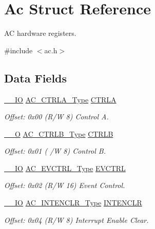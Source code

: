 \hypertarget{struct_ac}{}\section{Ac Struct Reference}
\label{struct_ac}


AC hardware registers.  




{\ttfamily \#include $<$ac.\+h$>$}

\subsection*{Data Fields}
\begin{DoxyCompactItemize}
\item 
\mbox{\hyperlink{core__cm0plus_8h_aec43007d9998a0a0e01faede4133d6be}{\+\_\+\+\_\+\+IO}} \mbox{\hyperlink{union_a_c___c_t_r_l_a___type}{A\+C\+\_\+\+C\+T\+R\+L\+A\+\_\+\+Type}} \mbox{\hyperlink{struct_ac_a3209b7b8f542b802bd759d39be69aed8}{C\+T\+R\+LA}}
\begin{DoxyCompactList}\small\item\em Offset\+: 0x00 (R/W 8) Control A. \end{DoxyCompactList}\item 
\mbox{\hyperlink{core__cm0plus_8h_a7e25d9380f9ef903923964322e71f2f6}{\+\_\+\+\_\+O}} \mbox{\hyperlink{union_a_c___c_t_r_l_b___type}{A\+C\+\_\+\+C\+T\+R\+L\+B\+\_\+\+Type}} \mbox{\hyperlink{struct_ac_a05e0ac5f8548b79a95ad9a3f2bbc5641}{C\+T\+R\+LB}}
\begin{DoxyCompactList}\small\item\em Offset\+: 0x01 ( /W 8) Control B. \end{DoxyCompactList}\item 
\mbox{\hyperlink{core__cm0plus_8h_aec43007d9998a0a0e01faede4133d6be}{\+\_\+\+\_\+\+IO}} \mbox{\hyperlink{union_a_c___e_v_c_t_r_l___type}{A\+C\+\_\+\+E\+V\+C\+T\+R\+L\+\_\+\+Type}} \mbox{\hyperlink{struct_ac_a321f3540f3ac416a80a108404610685d}{E\+V\+C\+T\+RL}}
\begin{DoxyCompactList}\small\item\em Offset\+: 0x02 (R/W 16) Event Control. \end{DoxyCompactList}\item 
\mbox{\hyperlink{core__cm0plus_8h_aec43007d9998a0a0e01faede4133d6be}{\+\_\+\+\_\+\+IO}} \mbox{\hyperlink{union_a_c___i_n_t_e_n_c_l_r___type}{A\+C\+\_\+\+I\+N\+T\+E\+N\+C\+L\+R\+\_\+\+Type}} \mbox{\hyperlink{struct_ac_a8aaec35ee2c80cf37cb569c95943d6ea}{I\+N\+T\+E\+N\+C\+LR}}
\begin{DoxyCompactList}\small\item\em Offset\+: 0x04 (R/W 8) Interrupt Enable Clear. \end{DoxyCompactList}\item 

\end{DoxyCompactItemize}
